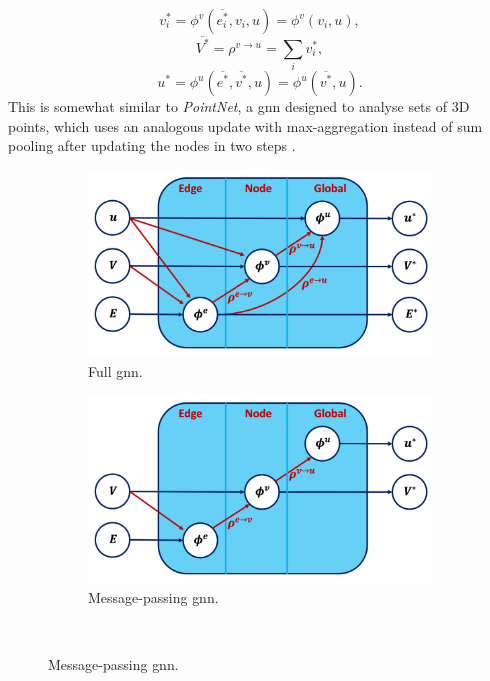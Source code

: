\[v^*_i = \phi^v(\overline{e^*_i}, v_i, u) = \phi^v(v_i, u),\] 
\[\overline{V^*} = \rho^{v \rightarrow u} = \sum_i v^*_i,\] 
\[u^* = \phi^u(\overline{e^*}, \overline{v^*}, u) = \phi^u( \overline{v^*}, u).\] This is somewhat similar to \textit{PointNet}, a \gls{gnn} designed to analyse sets of 3D points, which uses an analogous update with max-aggregation instead of sum pooling after updating the nodes in two steps \cite{pointNet}.  

\begin{figure}[h!]
    \centering
    \begin{subfigure}[b]{0.49\textwidth}
        \centering
        \includegraphics[scale=0.43]{Images/ML/fullGNN.png}
        \caption{Full \gls{gnn}.} 
        \label{fig:diverseGNNfull}
    \end{subfigure}
    \hfill
    \begin{subfigure}[b]{0.49\textwidth}
        \centering
        \includegraphics[scale=0.43]{Images/ML/messagepassingNN.png}
        \caption{Message-passing \gls{gnn}.} 
        \label{fig:pullsFTAGmp}
    \end{subfigure}
    \\  %

\end{figure}
